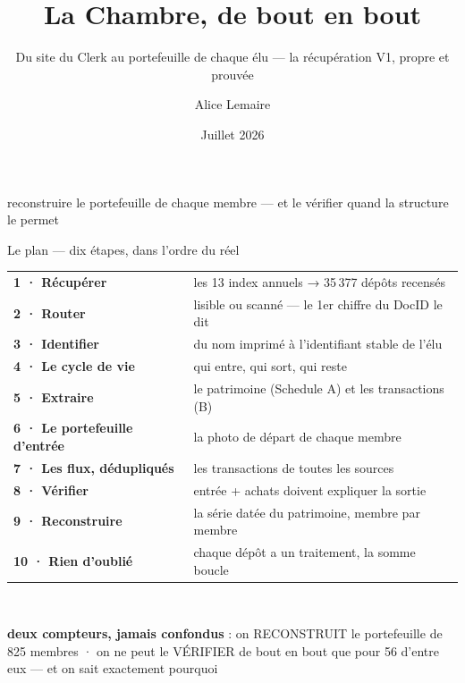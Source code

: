 \documentclass[11pt,aspectratio=169]{beamer}
\title[La Chambre, de bout en bout]{La Chambre, de bout en bout}
\subtitle{Du site du Clerk au portefeuille de chaque élu — la récupération V1, propre et prouvée}
\author[A.~Lemaire]{Alice Lemaire}
\institute[Ramify]{Document de recherche — livrable Ramify}
\date{Juillet 2026}
\begin{document}
{
\begin{frame}[plain]
  \titlepage
  \centering
  {\footnotesize reconstruire le portefeuille de chaque membre —
   et le vérifier quand la structure le permet}
\end{frame}}

\begin{frame}{Le plan — dix étapes, dans l'ordre du réel}
  \centering
  {\footnotesize\setlength{\tabcolsep}{5pt}\renewcommand{\arraystretch}{1.1}
  \begin{tabular}{l l}
    \textbf{1 · Récupérer} & les 13 index annuels → 35\,377 dépôts recensés \\
    \textbf{2 · Router} & lisible ou scanné — le 1er chiffre du DocID le dit \\
    \textbf{3 · Identifier} & du nom imprimé à l'identifiant stable de l'élu \\
    \textbf{4 · Le cycle de vie} & qui entre, qui sort, qui reste \\
    \textbf{5 · Extraire} & le patrimoine (Schedule A) et les transactions (B) \\
    \textbf{6 · Le portefeuille d'entrée} & la photo de départ de chaque membre \\
    \textbf{7 · Les flux, dédupliqués} & les transactions de toutes les sources \\
    \textbf{8 · Vérifier} & entrée + achats doivent expliquer la sortie \\
    \textbf{9 · Reconstruire} & la série datée du patrimoine, membre par membre \\
    \textbf{10 · Rien d'oublié} & chaque dépôt a un traitement, la somme boucle \\
  \end{tabular}}\\[3mm]
  \colorbox{helec}{\parbox{0.92\textwidth}{\footnotesize\color{white}\centering
    \textbf{deux compteurs, jamais confondus} : on RECONSTRUIT le portefeuille de
    825 membres · on ne peut le VÉRIFIER de bout en bout que pour
    56 d'entre eux — et on sait exactement pourquoi}}
\end{frame}
\end{document}
